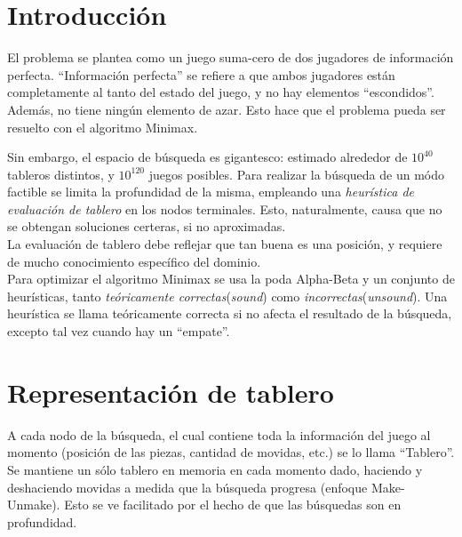 \documentclass{article}
\begin{document}
\begin{multicols}{2}

\section{Introducción}

El problema se plantea como un juego suma-cero \footnotemark de dos
jugadores de información perfecta. ``Información perfecta'' se refiere
a que ambos jugadores están completamente al tanto del estado del
juego, y no hay elementos ``escondidos''. Además, no tiene ningún
elemento de azar. Esto hace que el problema pueda ser resuelto con el
algoritmo Minimax\cite{norvig-russell}.
\\


Sin embargo, el espacio de búsqueda es gigantesco: estimado alrededor
de $10^{40}$ tableros distintos, y $10^{120}$ juegos posibles. Para
realizar la búsqueda de un módo factible se limita la profundidad de
la misma, empleando una \emph{heurística de evaluación de tablero}
en los nodos terminales. Esto, naturalmente, causa que no se obtengan
soluciones certeras, si no aproximadas.
\\

La evaluación de tablero debe reflejar que tan buena es una posición,
y requiere de mucho conocimiento específico del dominio.
\\

Para optimizar el algoritmo Minimax se usa la poda Alpha-Beta y un
conjunto de heurísticas, tanto \emph{teóricamente correctas}(\emph
{sound}) como \emph{incorrectas}(\emph{unsound}). Una heurística se
llama teóricamente correcta si no afecta el resultado de la búsqueda,
excepto tal vez cuando hay un ``empate''.

\section{Representación de tablero}

A cada nodo de la búsqueda, el cual contiene toda la información del
juego al momento (posición de las piezas, cantidad de movidas, etc.) se
lo llama ``Tablero''.
\\

Se mantiene un sólo tablero en memoria en cada momento dado, haciendo
y deshaciendo movidas a medida que la búsqueda progresa (enfoque
Make-Unmake). Esto se ve facilitado por el hecho de que las búsquedas
son en profundidad.
\\


\end{multicols}
\end{document}
